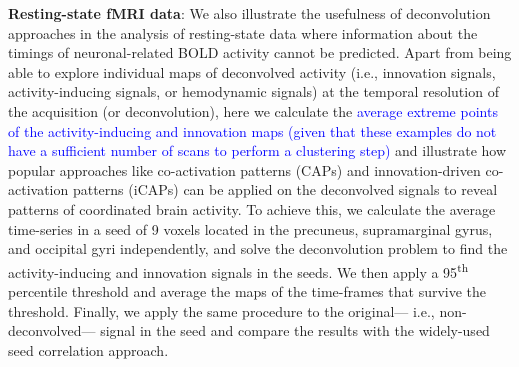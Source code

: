 \textbf{Resting-state fMRI data}: We also illustrate the usefulness of
deconvolution approaches in the analysis of resting-state data where information
about the timings of neuronal-related BOLD activity cannot be predicted. Apart
from being able to explore individual maps of deconvolved activity (i.e.,
innovation signals, activity-inducing signals, or hemodynamic signals) at the
temporal resolution of the acquisition (or deconvolution), here we calculate the
\textcolor{blue}{average extreme points of the activity-inducing and innovation
maps (given that these examples do not have a sufficient number of scans to
perform a clustering step)} and illustrate how popular approaches like
co-activation patterns
(CAPs)\citep{Tagliazucchi2012,Liu2018Coactivationpatterns} and innovation-driven
co-activation patterns (iCAPs) \citep{Karahanoglu2015Transientbrainactivity} can
be applied on the deconvolved signals to reveal patterns of coordinated brain
activity. To achieve this, we calculate the average time-series in a seed of 9
voxels located in the precuneus, supramarginal gyrus, and occipital gyri
independently, and solve the deconvolution problem to find the activity-inducing
and innovation signals in the seeds. We then apply a 95\textsuperscript{th}
percentile threshold and average the maps of the time-frames that survive the
threshold. Finally, we apply the same procedure to the original--- i.e.,
non-deconvolved--- signal in the seed and compare the results with the
widely-used seed correlation approach.